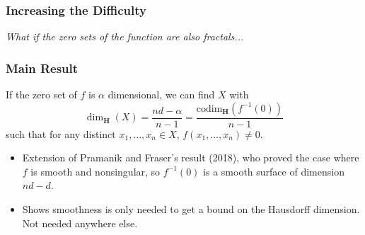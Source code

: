 \documentclass{beamer}
\begin{document}
\begin{frame}
    \frametitle{Increasing the Difficulty}

    \begin{center}
     \Huge {\it What if the zero sets of the function are also fractals...}
    \end{center}
\end{frame}







\begin{frame}
    \frametitle{Main Result}

    \begin{theorem}
        If the zero set of $f$ is $\alpha$ dimensional, we can find $X$ with
        \[ \dim_{\mathbf{H}}(X) = \frac{nd - \alpha}{n - 1} = \frac{\text{codim}_{\mathbf{H}}(f^{-1}(0))}{n - 1} \]
        such that for any distinct $x_1, \dots, x_n \in X$, $f(x_1, \dots, x_n) \neq 0$.
    \end{theorem}

    \pause

    \begin{itemize}
        \item Extension of Pramanik and Fraser's result (2018), who proved the case where $f$ is smooth and nonsingular, so $f^{-1}(0)$ is a smooth surface of dimension $nd - d$.
        \pause

        \item Shows smoothness is only needed to get a bound on the Hausdorff dimension. Not needed anywhere else.
    \end{itemize}
\end{frame}
\end{document}
